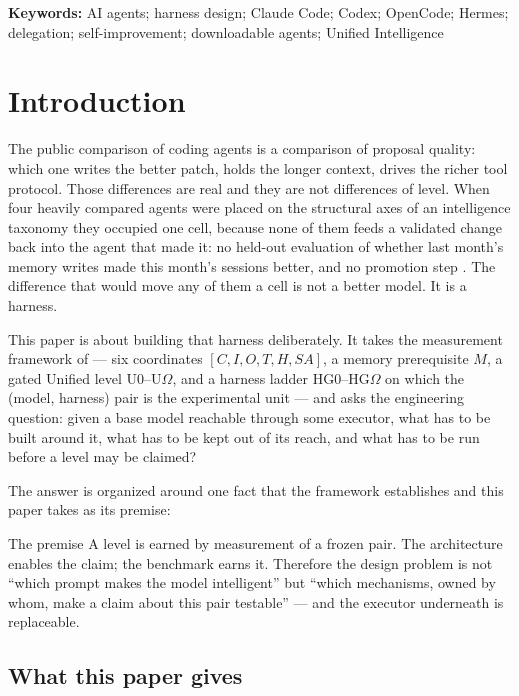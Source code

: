 \documentclass[11pt]{article}
\theoremstyle{definition}
\newcommand{\Om}{\ensuremath{\Omega}}
\begin{document}
\noindent\textbf{Keywords:} AI agents; harness design; Claude Code; Codex; OpenCode; Hermes; delegation; self-improvement; downloadable agents; Unified Intelligence

\tableofcontents
\bigskip

\section{Introduction}\label{sec:intro}

The public comparison of coding agents is a comparison of proposal quality: which one writes the better patch, holds the longer context, drives the richer tool protocol. Those differences are real and they are not differences of level. When four heavily compared agents were placed on the structural axes of an intelligence taxonomy they occupied one cell, because none of them feeds a validated change back into the agent that made it: no held-out evaluation of whether last month's memory writes made this month's sessions better, and no promotion step \citep{yang2026capability}. The difference that would move any of them a cell is not a better model. It is a harness.

This paper is about building that harness deliberately. It takes the measurement framework of \citet{yang2026unified} --- six coordinates $[C,I,O,T,H,SA]$, a memory prerequisite $M$, a gated Unified level U0--U\Om{}, and a harness ladder HG0--HG\Om{} on which the (model, harness) pair is the experimental unit --- and asks the engineering question: given a base model reachable through some executor, what has to be built around it, what has to be kept out of its reach, and what has to be run before a level may be claimed?

The answer is organized around one fact that the framework establishes and this paper takes as its premise:

\begin{claimbox}{The premise}
A level is earned by measurement of a frozen pair. The architecture enables the claim; the benchmark earns it. Therefore the design problem is not ``which prompt makes the model intelligent'' but ``which mechanisms, owned by whom, make a claim about this pair testable'' --- and the executor underneath is replaceable.
\end{claimbox}

\subsection{What this paper gives}
\end{document}
